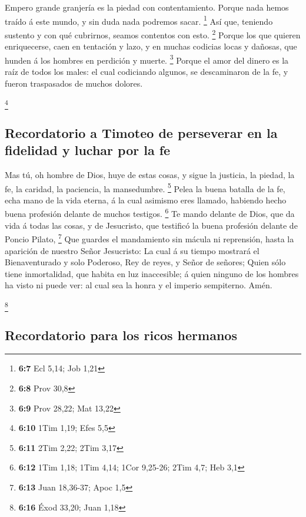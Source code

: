  Empero grande granjería es la piedad con contentamiento.
 Porque nada hemos traído á este mundo, y sin duda nada
podremos sacar. \footnote{\textbf{6:7} Ecl 5,14; Job 1,21}
 Así que, teniendo sustento y con qué cubrirnos, seamos
contentos con esto. \footnote{\textbf{6:8} Prov 30,8} 
Porque los que quieren enriquecerse, caen en tentación y lazo, y en
muchas codicias locas y dañosas, que hunden á los hombres en perdición y
muerte. \footnote{\textbf{6:9} Prov 28,22; Mat 13,22} 
Porque el amor del dinero es la raíz de todos los males: el cual
codiciando algunos, se descaminaron de la fe, y fueron traspasados de
muchos dolores.

\footnote{\textbf{6:10} 1Tim 1,19; Efes 5,5}

\hypertarget{recordatorio-a-timoteo-de-perseverar-en-la-fidelidad-y-luchar-por-la-fe}{%
\subsection{Recordatorio a Timoteo de perseverar en la fidelidad y
luchar por la
fe}\label{recordatorio-a-timoteo-de-perseverar-en-la-fidelidad-y-luchar-por-la-fe}}

 Mas tú, oh hombre de Dios, huye de estas cosas, y sigue
la justicia, la piedad, la fe, la caridad, la paciencia, la mansedumbre.
\footnote{\textbf{6:11} 2Tim 2,22; 2Tim 3,17}  Pelea la
buena batalla de la fe, echa mano de la vida eterna, á la cual asimismo
eres llamado, habiendo hecho buena profesión delante de muchos testigos.
\footnote{\textbf{6:12} 1Tim 1,18; 1Tim 4,14; 1Cor 9,25-26; 2Tim 4,7;
  Heb 3,1}  Te mando delante de Dios, que da vida á todas
las cosas, y de Jesucristo, que testificó la buena profesión delante de
Poncio Pilato, \footnote{\textbf{6:13} Juan 18,36-37; Apoc 1,5}
 Que guardes el mandamiento sin mácula ni reprensión,
hasta la aparición de nuestro Señor Jesucristo:  La cual
á su tiempo mostrará el Bienaventurado y solo Poderoso, Rey de reyes, y
Señor de señores;  Quien sólo tiene inmortalidad, que
habita en luz inaccesible; á quien ninguno de los hombres ha visto ni
puede ver: al cual sea la honra y el imperio sempiterno. Amén.

\footnote{\textbf{6:16} Éxod 33,20; Juan 1,18}

\hypertarget{recordatorio-para-los-ricos-hermanos}{%
\subsection{Recordatorio para los ricos
hermanos}\label{recordatorio-para-los-ricos-hermanos}}

